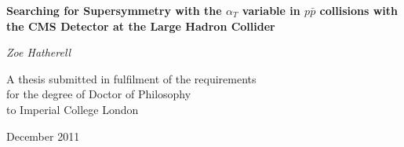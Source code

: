 \pagestyle{empty}

\begin{center}
\LARGE
{\bf  Searching for Supersymmetry with the $\alpha_{T}$ variable in $p \bar{p}$ collisions with the CMS Detector at the Large Hadron Collider}

\vspace{1cm}

\large
{\it Zoe Hatherell}

\vspace{2cm}
\normalsize
A thesis submitted in fulfilment of the requirements\\
for the degree of Doctor of Philosophy\\
to Imperial College London

December 2011
\end{center}


